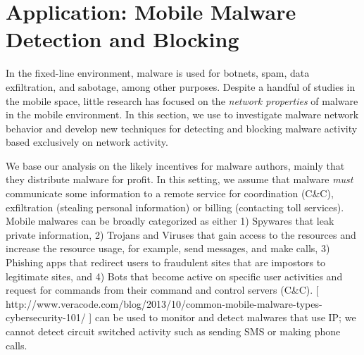 \section{Application: Mobile Malware \\
Detection and Blocking}
\label{sec:malware}

%
%
%


In the fixed-line environment, malware is used for botnets, spam, data exfiltration, and sabotage, among other 
purposes. Despite a handful of studies in the mobile space, little research has focused on the \emph{network 
properties} of malware in the mobile environment. In this section, we use \meddle to investigate malware network 
behavior and develop new techniques for detecting and blocking malware activity based exclusively on network 
activity.

 We base our analysis on the likely incentives for malware authors, mainly 
that they distribute malware for profit. 
In this setting, we assume that malware \emph{must} communicate some information to a remote service for coordination (\eg C\&C), exfiltration (stealing personal information) or billing (contacting toll services). 
Mobile malwares can be broadly categorized as either 1) Spywares that leak private information, 2) Trojans and Viruses that gain access to the resources and increase the resource usage, for example, send messages, and make calls, 3) Phishing apps that redirect users to fraudulent sites that are impostors to legitimate sites, and 4) Bots that become active on specific user activities and request for commands from their command and control servers (C\&C). 
[ http://www.veracode.com/blog/2013/10/common-mobile-malware-types-cybersecurity-101/ ] 
\meddle can be used to monitor and detect malwares that use IP; we cannot detect circuit switched activity such as sending SMS or making phone calls.

